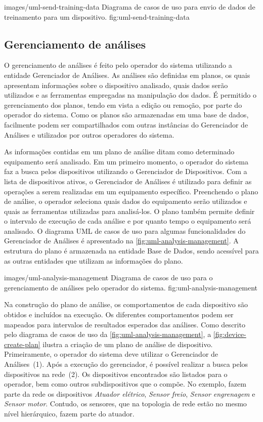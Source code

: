   {images/uml-send-training-data}
  {Diagrama de casos de uso para envio de dados de treinamento para um dispositivo.}
  {fig:uml-send-training-data}


\subsection{Gerenciamento de análises}

O gerenciamento de análises é feito pelo operador do sistema utilizando a entidade Gerenciador de
Análises. As análises são definidas em planos, os quais apresentam informações sobre o dispositivo
analisado, quais dados serão utilizados e as ferramentas empregadas na manipulação dos dados. É
permitido o gerenciamento dos planos, tendo em vista a edição ou remoção, por parte do operador do
sistema. Como os planos são armazenadas em uma base de dados, facilmente podem ser compartilhados
com outras instâncias do Gerenciador de Análises e utilizados por outros operadores do sistema.

As informações contidas em um plano de análise ditam como determinado equipamento será analisado. Em
um primeiro momento, o operador do sistema faz a busca pelos dispositivos utilizando o Gerenciador
de Dispositivos. Com a lista de dispositivos ativos, o Gerenciador de Análises é utilizado para
definir as operações a serem realizadas em um equipamento específico. Preenchendo o plano de
análise, o operador seleciona quais dados do equipamento serão utilizados e quais as ferramentas
utilizadas para analisá-los. O plano também permite definir o intervalo de execução de cada análise
e por quanto tempo o equipamento será analisado. O diagrama \gls{UML} de casos de uso para algumas
funcionalidades do Gerenciador de Análises é apresentado na \cref{fig:uml-analysis-management}. A
estrutura do plano é armazenada na entidade Base de Dados, sendo acessível para as outras entidades
que utilizam as informações do plano.

  {images/uml-analysis-management}
  {Diagrama de casos de uso para o gerenciamento de análises pelo operador do sistema.}
  {fig:uml-analysis-management}

Na construção do plano de análise, os comportamentos de cada dispositivo são obtidos e incluídos na
execução. Os diferentes comportamentos podem ser mapeados para intervalos de resultados esperados
das análises. Como descrito pelo diagrama de casos de uso da \cref{fig:uml-analysis-management}, a
\cref{fig:device-create-plan} ilustra a criação de um plano de análise de dispositivo.
Primeiramente, o operador do sistema deve utilizar o Gerenciador de Análises~(1). Após a execução do
gerenciador, é possível realizar a busca pelos dispositivos na rede~(2). Os dispositivos encontrados
são listados para o operador, bem como outros subdispositivos que o compõe. No exemplo, fazem parte
da rede os dispositivos \emph{Atuador elétrico}, \emph{Sensor freio}, \emph{Sensor engrenagem} e
\emph{Sensor motor}. Contudo, os sensores, que na topologia de rede estão no mesmo nível
hierárquico, fazem parte do atuador.

